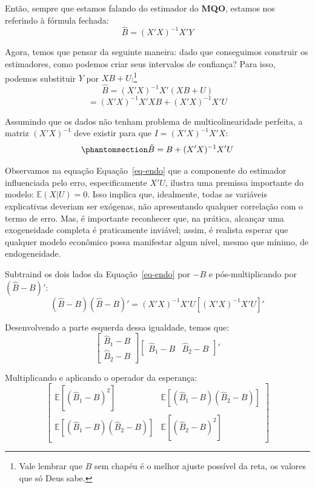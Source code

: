 \documentclass[
  letterpaper,
  DIV=11,
  numbers=noendperiod]{scrreprt}
\theoremstyle{definition}
\theoremstyle{plain}
\theoremstyle{remark}
\begin{document}
Então, sempre que estamos falando do estimador do \textbf{MQO}, estamos
nos referindo à fórmula fechada: \[
\hat{B} = (X' X)^{-1} X' Y
\]

Agora, temos que pensar da seguinte maneira: dado que conseguimos
construir os estimadores, como podemos criar seus intervalos de
confiança? Para isso, podemos substituir \(Y\) por
\(XB + U\):\footnote{Vale lembrar que \(B\) sem chapéu é o melhor ajuste
  possível da reta, os valores que só Deus sabe.} \[
\hat{B} = (X' X)^{-1} X' (XB + U)
\] \[
= (X' X)^{-1} X' XB + (X' X)^{-1} X' U
\]

Assumindo que os dados não tenham problema de multicolinearidade
perfeita, a matriz \((X' X)^{-1}\) deve existir para que
\(I = (X' X)^{-1} X' X\):
\begin{equation}\phantomsection\label{eq-endo}{
\hat{B} = B + (X' X)^{-1} X' U
}\end{equation}

Observamos na equação Equação~\ref{eq-endo} que a componente do
estimador influenciada pelo erro, especificamente \(X' U\), ilustra uma
premissa importante do modelo: \(\mathbb{E}(X | U) = 0\). Isso implica
que, idealmente, todas as variáveis explicativas deveriam ser exógenas,
não apresentando qualquer correlação com o termo de erro. Mas, é
importante reconhecer que, na prática, alcançar uma exogeneidade
completa é praticamente inviável; assim, é realista esperar que qualquer
modelo econômico possa manifestar algum nível, mesmo que mínimo, de
endogeneidade.

Subtraind os dois lados da Equação~\ref{eq-endo} por \(-B\) e
pós-multiplicando por \((\hat{B} - B)'\): \[
(\hat{B} - B)(\hat{B} - B)' = (X' X)^{-1} X' U[(X' X)^{-1} X' U]'
\]

Desenvolvendo a parte esquerda dessa igualdade, temos que: \[
\begin{bmatrix}
\hat{B}_{1} - B \\
\hat{B}_{2} - B
\end{bmatrix}
\begin{bmatrix}
\hat{B}_{1} - B & \hat{B}_{2} - B
\end{bmatrix}'
\]

Multiplicando e aplicando o operador da esperança: \[
\begin{bmatrix}
\mathbb{E}[(\hat{B}_{1} - B)^{2}] & \mathbb{E}[(\hat{B}_{1} - B)(\hat{B}_{2} - B)] \\
\mathbb{E}[(\hat{B}_{1} - B)(\hat{B}_{2} - B)] & \mathbb{E}[(\hat{B}_{2} - B)^{2}]
\end{bmatrix}
\]
\end{document}
